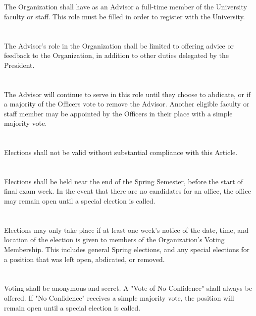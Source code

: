 \documentclass[12pt]{cls/constitution}
\begin{document}
\section{}
The Organization shall have as an Advisor a full-time member of the University faculty or staff. This role must be filled in order to register with the University.

\section{}
The Advisor’s role in the Organization shall be limited to offering advice or feedback to the Organization, in addition to other duties delegated by the President.

\section{}
The Advisor will continue to serve in this role until they choose to abdicate, or if a majority of the Officers vote to remove the Advisor. Another eligible faculty or staff member may be appointed by the Officers in their place with a simple majority vote.


\section{}
Elections shall not be valid without substantial compliance with this Article. 

\section{}
Elections shall be held near the end of the Spring Semester, before the start of final exam week. In the event that there are no candidates for an office, the office may remain open until a special election is called. 

\section{}
Elections may only take place if at least one week’s notice of the date, time, and location of the election is given to members of the Organization's Voting Membership. This includes general Spring elections, and any special elections for a position that was left open, abdicated, or removed.

\section{}
Voting shall be anonymous and secret. A "Vote of No Confidence" shall always be offered. If "No Confidence" receives a simple majority vote, the position will remain open until a special election is called.
\end{document}
